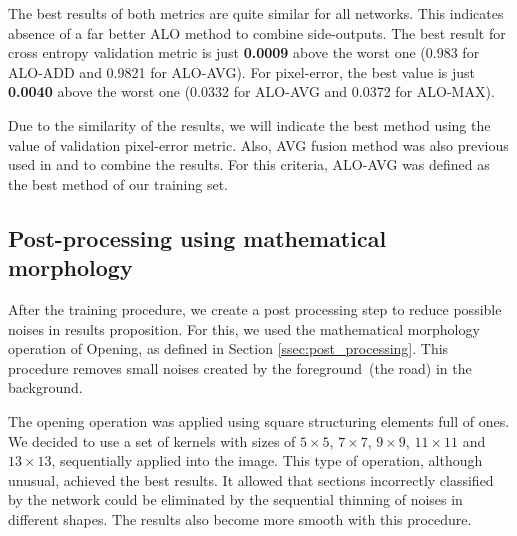 The best results of both metrics are quite similar for all networks. This indicates absence of a far better ALO method to combine side-outputs. The best result for cross entropy validation metric is just \textbf{0.0009} above the worst one (0.983 for ALO-ADD and 0.9821 for ALO-AVG). For pixel-error, the best value is just \textbf{0.0040} above the worst one (0.0332 for ALO-AVG and 0.0372 for ALO-MAX).

Due to the similarity of the results, we will indicate the best method using the value of validation pixel-error metric. Also, AVG fusion method was also previous used in \cite{xie2015} and \cite{liu2017} to combine the results. For this criteria, ALO-AVG was defined as the best method of our training set.

\subsection{Post-processing using mathematical morphology}


After the training procedure, we create a post processing step to reduce possible noises in results proposition. For this, we used the mathematical morphology operation of Opening, as defined in Section \ref{ssec:post_processing}. This procedure removes small noises created by the foreground~(the road) in the background. 

The opening operation was applied using square structuring elements full of ones. We decided to use a set of kernels with sizes of $5\times5$, $7\times7$, $9\times9$, $11\times11$ and $13\times13$, sequentially applied into the image. This type of operation, although unusual, achieved the best results. It allowed that sections incorrectly classified by the network could be eliminated by the sequential thinning of noises in different shapes. The results also become more smooth with this procedure.


